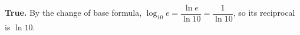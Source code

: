 \textbf{True.} By the change of base formula, $\log_{10}e=\dfrac{\ln e}{\ln10}=\dfrac1{\ln10}$, so its reciprocal is $\ln10$.
